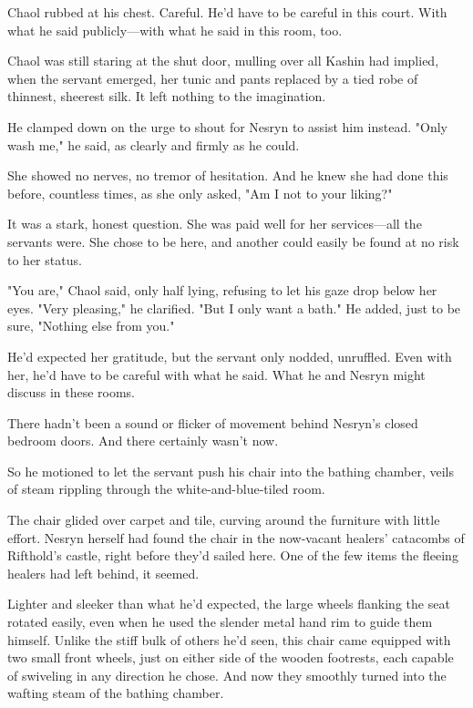 Chaol rubbed at his chest.
Careful.
He'd have to be careful in this court.
With what he said publicly---with what he said in this room, too.

Chaol was still staring at the shut door, mulling over all Kashin had implied, when the servant emerged, her tunic and pants replaced by a tied robe of thinnest, sheerest silk.
It left nothing to the imagination.

He clamped down on the urge to shout for Nesryn to assist him instead.
"Only wash me," he said, as clearly and firmly as he could.

She showed no nerves, no tremor of hesitation.
And he knew she had done this before, countless times, as she only asked, "Am I not to your liking?"

It was a stark, honest question.
She was paid well for her services---all the servants were.
She chose to be here, and another could easily be found at no risk to her status.

"You are," Chaol said, only half lying, refusing to let his gaze drop below her eyes.
"Very pleasing," he clarified.
"But I only want a bath."
He added, just to be sure, "Nothing else from you."

He'd expected her gratitude, but the servant only nodded, unruffled.
Even with her, he'd have to be careful with what he said.
What he and Nesryn might discuss in these rooms.

There hadn't been a sound or flicker of movement behind Nesryn's closed bedroom doors.
And there certainly wasn't now.

So he motioned to let the servant push his chair into the bathing chamber, veils of steam rippling through the white-and-blue-tiled room.

The chair glided over carpet and tile, curving around the furniture with little effort.
Nesryn herself had found the chair in the now-vacant healers' catacombs of Rifthold's castle, right before they'd sailed here.
One of the few items the fleeing healers had left behind, it seemed.

Lighter and sleeker than what he'd expected, the large wheels flanking the seat rotated easily, even when he used the slender metal hand rim to guide them himself.
Unlike the stiff bulk of others he'd seen, this chair came equipped with two small front wheels, just on either side of the wooden footrests, each capable of swiveling in any direction he chose.
And now they smoothly turned into the wafting steam of the bathing chamber.


